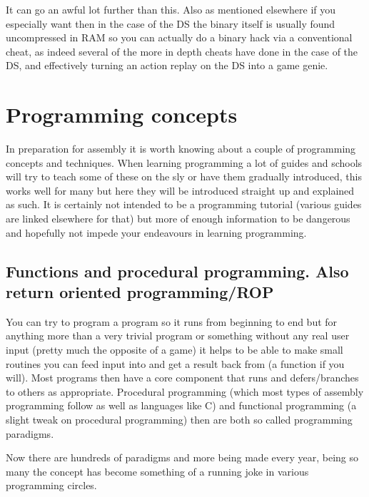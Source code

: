 \documentclass[
]{book}
\begin{document}
It can go an awful lot further than this. Also as mentioned elsewhere if you especially want then in the case of the DS the binary itself is usually found uncompressed in RAM so you can actually do a binary hack via a conventional cheat, as indeed several of the more in depth cheats have done in the case of the DS, and effectively turning an action replay on the DS into a game genie.

\hypertarget{programming-concepts}{%
\section{Programming concepts}\label{programming-concepts}}

In preparation for assembly it is worth knowing about a couple of programming concepts and techniques. When learning programming a lot of guides and schools will try to teach some of these on the sly or have them gradually introduced, this works well for many but here they will be introduced straight up and explained as such. It is certainly not intended to be a programming tutorial (various guides are linked elsewhere for that) but more of enough information to be dangerous and hopefully not impede your endeavours in learning programming.

\hypertarget{functions-and-procedural-programming.-also-return-oriented-programmingrop}{%
\subsection{Functions and procedural programming. Also return oriented programming/ROP}\label{functions-and-procedural-programming.-also-return-oriented-programmingrop}}

You can try to program a program so it runs from beginning to end but for anything more than a very trivial program or something without any real user input (pretty much the opposite of a game) it helps to be able to make small routines you can feed input into and get a result back from (a function if you will). Most programs then have a core component that runs and defers/branches to others as appropriate. Procedural programming (which most types of assembly programming follow as well as languages like C) and functional programming (a slight tweak on procedural programming) then are both so called programming paradigms.

Now there are hundreds of paradigms and more being made every year, being so many the concept has become something of a running joke in various programming circles.
\end{document}
